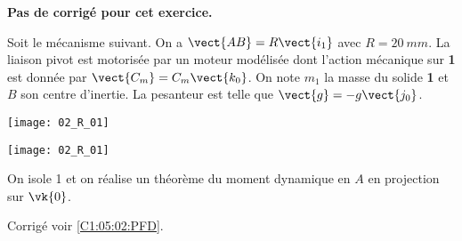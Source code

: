 \normaltrue
\correctiontrue


\setcounter{question}{0}
\ifcorrection
\else
\textbf{Pas de corrigé pour cet exercice.}
\fi

\ifprof
\else
Soit le mécanisme suivant. On a $\vect{AB}=R\vect{i_1}$ avec $R=\SI{20}{mm}$. La liaison pivot est motorisée par un moteur modélisée dont l'action mécanique sur \textbf{1} est donnée par $\vect{C_m}=C_m \vect{k_0}$.
On note $m_1$ la masse du solide \textbf{1} et $B$ son centre d'inertie. 
 La pesanteur est telle que $\vect{g}=-g\vect{j_0}$.

\begin{center}
\texttt{[image: 02\_R\_01]}
\end{center}

\fi
{}
\ifprof
\begin{center}
\texttt{[image: 02\_R\_01]}
\end{center}
\else
\fi

\ifprof
On isole 1 et on réalise un théorème du moment dynamique en $A$ en projection sur $\vk{0}$.
\else
\fi


\ifprof
\else
\begin{flushright}
\footnotesize{Corrigé  voir \ref{C1:05:02:PFD}.}
\end{flushright}%
\fi
